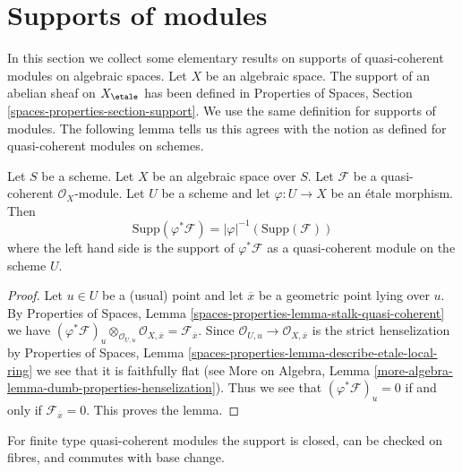 \section{Supports of modules}
\label{section-support}

\noindent
In this section we collect some elementary results on supports of
quasi-coherent modules on algebraic spaces. Let $X$ be an algebraic
space. The support of an abelian sheaf on $X_\etale$
has been defined in Properties of Spaces, Section
\ref{spaces-properties-section-support}.
We use the same definition for supports of modules.
The following lemma tells us this agrees with the notion
as defined for quasi-coherent modules on schemes.

\begin{lemma}
\label{lemma-support-covering}
Let $S$ be a scheme. Let $X$ be an algebraic space over $S$.
Let $\mathcal{F}$ be a quasi-coherent $\mathcal{O}_X$-module.
Let $U$ be a scheme and let $\varphi : U \to X$ be an \'etale morphism.
Then
$$
\text{Supp}(\varphi^*\mathcal{F}) = |\varphi|^{-1}(\text{Supp}(\mathcal{F}))
$$
where the left hand side is the support of $\varphi^*\mathcal{F}$ as a
quasi-coherent module on the scheme $U$.
\end{lemma}

\begin{proof}
Let $u\in U$ be a (usual) point and let $\overline{x}$ be a
geometric point lying over $u$. By
Properties of Spaces, Lemma \ref{spaces-properties-lemma-stalk-quasi-coherent}
we have
$(\varphi^*\mathcal{F})_u \otimes_{\mathcal{O}_{U, u}}
\mathcal{O}_{X, \overline{x}} = \mathcal{F}_{\overline{x}}$.
Since $\mathcal{O}_{U, u} \to \mathcal{O}_{X, \overline{x}}$
is the strict henselization by
Properties of Spaces, Lemma
\ref{spaces-properties-lemma-describe-etale-local-ring}
we see that it is faithfully flat (see
More on Algebra, Lemma
\ref{more-algebra-lemma-dumb-properties-henselization}).
Thus we see that $(\varphi^*\mathcal{F})_u = 0$ if and only if
$\mathcal{F}_{\overline{x}} = 0$. This proves the lemma.
\end{proof}

\noindent
For finite type quasi-coherent modules the support is closed,
can be checked on fibres, and commutes with base change.

